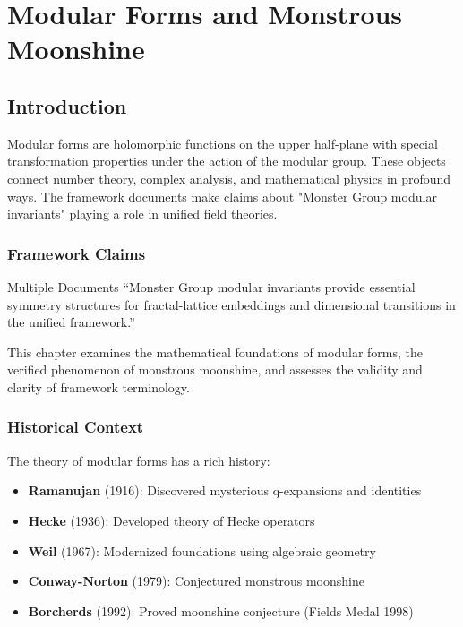 
\chapter{Modular Forms and Monstrous Moonshine}
\label{ch:modular_forms}

\section{Introduction}

Modular forms are holomorphic functions on the upper half-plane with special transformation properties under the action of the modular group. These objects connect number theory, complex analysis, and mathematical physics in profound ways. The framework documents make claims about "Monster Group modular invariants" playing a role in unified field theories.

\subsection{Framework Claims}

\begin{frameworkclaim}{Multiple Documents}
``Monster Group modular invariants provide essential symmetry structures for fractal-lattice embeddings and dimensional transitions in the unified framework.''
\end{frameworkclaim}

This chapter examines the mathematical foundations of modular forms, the verified phenomenon of monstrous moonshine, and assesses the validity and clarity of framework terminology.

\subsection{Historical Context}

The theory of modular forms has a rich history:
\begin{itemize}
    \item \textbf{Ramanujan} (1916): Discovered mysterious q-expansions and identities
    \item \textbf{Hecke} (1936): Developed theory of Hecke operators
    \item \textbf{Weil} (1967): Modernized foundations using algebraic geometry
    \item \textbf{Conway-Norton} (1979): Conjectured monstrous moonshine
    \item \textbf{Borcherds} (1992): Proved moonshine conjecture (Fields Medal 1998)
\end{itemize}

